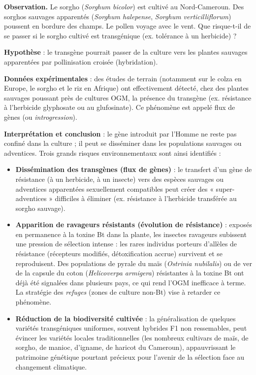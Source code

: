 \documentclass[11pt]{article}
\newcommand{\cle}[1]{{\popxbold\color{popdark}#1}}
\newcounter{popsec}
\newcounter{popsub}
\newcommand{\courssub}[1]{%
  \stepcounter{popsub}%
  \par\vspace{9pt}\noindent{\popxbold\fontsize{11.5}{13}\selectfont\color{popink}{\color{poporange}\thepopsec.\thepopsub}\hspace{6pt}#1}\par\nopagebreak\vspace{4pt}
}
\begin{document}
\courssub{Les risques environnementaux}

\textbf{Observation.} Le sorgho (\emph{Sorghum bicolor}) est cultivé au Nord-Cameroun. Des sorghos sauvages apparentés (\emph{Sorghum halepense}, \emph{Sorghum verticilliflorum}) poussent en bordure des champs. Le pollen voyage avec le vent. Que risque-t-il de se passer si le sorgho cultivé est transgénique (ex. tolérance à un herbicide) ?

\textbf{Hypothèse} : le transgène pourrait passer de la culture vers les plantes sauvages apparentées par pollinisation croisée (hybridation).

\textbf{Données expérimentales} : des études de terrain (notamment sur le colza en Europe, le sorgho et le riz en Afrique) ont effectivement détecté, chez des plantes sauvages poussant près de cultures OGM, la présence du transgène (ex. résistance à l'herbicide glyphosate ou au glufosinate). Ce phénomène est appelé \cle{flux de gènes} (ou \emph{introgression}).

\textbf{Interprétation et conclusion} : le gène introduit par l'Homme ne reste pas confiné dans la culture ; il peut se disséminer dans les populations sauvages ou adventices. Trois grands risques environnementaux sont ainsi identifiés :

\begin{itemize}
\item \textbf{Dissémination des transgènes (flux de gènes)} : le transfert d'un gène de résistance (à un herbicide, à un insecte) vers des espèces sauvages ou adventices apparentées sexuellement compatibles peut créer des « super-adventices » difficiles à éliminer (ex. résistance à l'herbicide transférée au sorgho sauvage).
\item \textbf{Apparition de ravageurs résistants (évolution de résistance)} : exposés en permanence à la toxine Bt dans la plante, les insectes ravageurs subissent une \cle{pression de sélection} intense : les rares individus porteurs d'allèles de résistance (récepteurs modifiés, détoxification accrue) survivent et se reproduisent. Des populations de pyrale du maïs (\emph{Ostrinia nubilalis}) ou de ver de la capsule du coton (\emph{Helicoverpa armigera}) résistantes à la toxine Bt ont déjà été signalées dans plusieurs pays, ce qui rend l'OGM inefficace à terme. La stratégie des \emph{refuges} (zones de culture non-Bt) vise à retarder ce phénomène.
\item \textbf{Réduction de la biodiversité cultivée} : la généralisation de quelques variétés transgéniques uniformes, souvent hybrides F1 non ressemables, peut évincer les variétés locales traditionnelles (les nombreux cultivars de maïs, de sorgho, de manioc, d'igname, de haricot du Cameroun), appauvrissant le patrimoine génétique pourtant précieux pour l'avenir de la sélection face au changement climatique.
\end{itemize}
\end{document}
